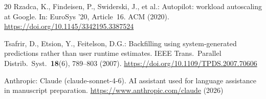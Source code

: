 \documentclass[conference]{IEEEtran}
\begin{document}
\begin{thebibliography}{20}
Rzadca, K., Findeisen, P., Swiderski, J., et al.: Autopilot: workload
autoscaling at Google.
In: EuroSys '20, Article~16. ACM (2020).
\url{https://doi.org/10.1145/3342195.3387524}

Tsafrir, D., Etsion, Y., Feitelson, D.G.: Backfilling using
system-generated predictions rather than user runtime estimates.
IEEE Trans.\ Parallel Distrib.\ Syst.\ \textbf{18}(6), 789--803 (2007).
\url{https://doi.org/10.1109/TPDS.2007.70606}

Anthropic: Claude (claude-sonnet-4-6). AI assistant used for
language assistance in manuscript preparation.
\url{https://www.anthropic.com/claude} (2026)

\end{thebibliography}
\end{document}
